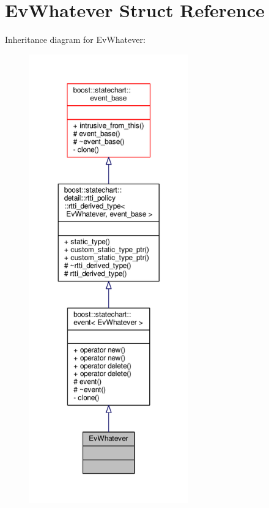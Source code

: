 \hypertarget{struct_ev_whatever}{}\section{Ev\+Whatever Struct Reference}
\label{struct_ev_whatever}


Inheritance diagram for Ev\+Whatever\+:
\nopagebreak
\begin{figure}[H]
\begin{center}
\leavevmode
\includegraphics[height=550pt]{struct_ev_whatever__inherit__graph}
\end{center}
\end{figure}


